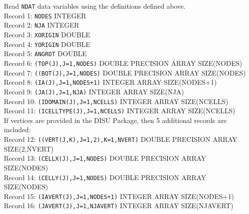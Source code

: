 \vspace{5mm}
\noindent Read \texttt{NDAT} data variables using the definitions defined above. \\
\noindent Record 1: \texttt{NODES} {\color{red} \footnotesize{INTEGER}} \\
\noindent Record 2: \texttt{NJA} {\color{red} \footnotesize{INTEGER}} \\
\noindent Record 3: \texttt{XORIGIN} {\color{red} \footnotesize{DOUBLE}} \\
\noindent Record 4: \texttt{YORIGIN} {\color{red} \footnotesize{DOUBLE}} \\
\noindent Record 5: \texttt{ANGROT} {\color{red} \footnotesize{DOUBLE}} \\
\noindent Record 6: \texttt{(TOP(J),J=1,NODES)} {\color{red} \footnotesize{DOUBLE PRECISION ARRAY SIZE(NODES)}} \\
\noindent Record 7: \texttt{((BOT(J),J=1,NODES)} {\color{red} \footnotesize{DOUBLE PRECISION ARRAY SIZE(NODES)}} \\
\noindent Record 8: \texttt{(IA(J),J=1,NODES+1)} {\color{red} \footnotesize{INTEGER ARRAY SIZE(NODES+1)}} \\
\noindent Record 9: \texttt{(JA(J),J=1,NJA)} {\color{red} \footnotesize{INTEGER ARRAY SIZE(NJA)}} \\
\noindent Record 10: \texttt{(IDOMAIN(J),J=1,NCELLS)} {\color{red} \footnotesize{INTEGER ARRAY SIZE(NCELLS)}} \\
\noindent Record 11: \texttt{(ICELLTYPE(J),J=1,NCELLS)} {\color{red} \footnotesize{INTEGER ARRAY SIZE(NCELLS)}} \\

\vspace{5mm}
\noindent If vertices are provided in the DISU Package, then 5 additional records are included: \\
\noindent Record 12: \texttt{((VERT(J,K),J=1,2),K=1,NVERT)} {\color{red} \footnotesize{DOUBLE PRECISION ARRAY SIZE(2,NVERT)}} \\
\noindent Record 13: \texttt{(CELLX(J),J=1,NODES)} {\color{red} \footnotesize{DOUBLE PRECISION ARRAY SIZE(NODES)}}\\
\noindent Record 14: \texttt{(CELLY(J),J=1,NODES)} {\color{red} \footnotesize{DOUBLE PRECISION ARRAY SIZE(NODES)}} \\
\noindent Record 15: \texttt{(IAVERT(J),J=1,NODES+1)} {\color{red} \footnotesize{INTEGER ARRAY SIZE(NODES+1)}} \\
\noindent Record 16: \texttt{(JAVERT(J),J=1,NJAVERT)} {\color{red} \footnotesize{INTEGER ARRAY SIZE(NJAVERT)}} \\


